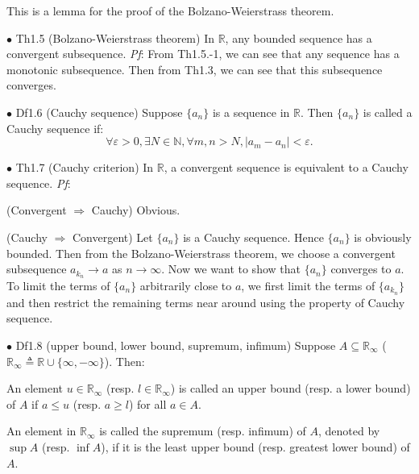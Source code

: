 \documentclass{article}
\begin{document}
\begin{Rmk}{}
    This is a lemma for the proof of the Bolzano-Weierstrass theorem.
\end{Rmk}

\begin{Th}{$\bullet$ Th1.5 (Bolzano-Weierstrass theorem)}
    In $\mathbb{R}$, any bounded sequence has a convergent subsequence.
    \tcblower
    \textit{Pf}: From Th1.5.-1, we can see that any sequence has a monotonic subsequence. Then from Th1.3, we can see that this subsequence converges.
\end{Th}

\begin{Df}{$\bullet$ Df1.6 (Cauchy sequence)}
    Suppose $\{a_n\}$ is a sequence in $\mathbb{R}$. Then $\{a_n\}$ is called a Cauchy sequence if:
    $$\forall \varepsilon>0, \exists N\in\mathbb{N}, \forall m, n > N, |a_m-a_n|<\varepsilon.$$
\end{Df}

\begin{Th}{$\bullet$ Th1.7 (Cauchy criterion)}
    In $\mathbb{R}$, a convergent sequence is equivalent to a Cauchy sequence.
    \tcblower
    \textit{Pf}: 
    \begin{compactenum}
        \item (Convergent $\Rightarrow$ Cauchy) Obvious.
        \item (Cauchy $\Rightarrow$ Convergent) Let $\{a_n\}$ is a Cauchy sequence. Hence $\{a_n\}$ is obviously bounded. Then from the Bolzano-Weierstrass theorem, we choose a convergent subsequence $a_{k_n} \rightarrow a$ as $n\to \infty$. Now we want to show that $\{a_n\}$ converges to $a$. To limit the terms of $\{a_n\}$ arbitrarily close to $a$, we first limit the terms of $\{a_{k_n}\}$ and then restrict the remaining terms near around using the property of Cauchy sequence.
    \end{compactenum}
\end{Th}

\begin{Df}{$\bullet$ Df1.8 (upper bound, lower bound, supremum, infimum)}
    Suppose $A\subseteq\mathbb{R}_\infty$ (\textcolor{Df}{$\mathbb{R}_\infty\triangleq\mathbb{R}\cup\{\infty, -\infty\}$}). Then:
    \begin{compactenum}
        \item An element $u\in\mathbb{R}_\infty$ (resp. $l\in\mathbb{R}_\infty$) is called an upper bound (resp. a lower bound) of $A$ if $a\leq u$ (resp. $a\geq l$) for all $a\in A$.
        \item An element in $\mathbb{R}_\infty$ is called the supremum (resp. infimum) of $A$, denoted by $\sup A$ (resp. $\inf A$), if it is the least upper bound (resp. greatest lower bound) of $A$.
    \end{compactenum}
\end{Df}
\end{document}
